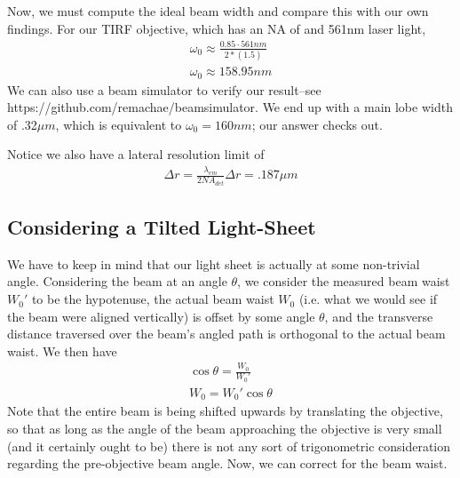     Now, we must compute the ideal beam width and compare this with our own findings. For our TIRF objective, which has an NA of and 561nm laser light,
    \begin{gather}
        \omega_0 \approx \frac{0.85\cdot561nm}{2*(1.5)}\\
        \omega_0 \approx 158.95nm
    \end{gather}
We can also use a beam simulator to verify our result--see https://github.com/remachae/beamsimulator. We end up with a main lobe width of .32$\mu m$, which is equivalent to $\omega_0=160nm$; our answer checks out.\par
Notice we also have a lateral \cite{Ernst} resolution limit of 
\begin{gather}
    \Delta r = \frac{\lambda_{em}}{2 NA_{det}}
    \Delta r = .187 \mu m
\end{gather}
\subsection{Considering a Tilted Light-Sheet}
We have to keep in mind that our light sheet is actually at some non-trivial angle. Considering the beam at an angle $\theta$, we consider the measured beam waist $W_0'$ to be the hypotenuse, the actual beam waist $W_0$ (i.e. what we would see if the beam were aligned vertically) is offset by some angle $\theta$, and the transverse distance traversed over the beam's angled path is orthogonal to the actual beam waist. We then have 
\begin{align}
    \cos \theta = \frac{W_{0}}{W_0'}\\
    W_0 = W_0' \cos \theta 
\end{align}
Note that the entire beam is being shifted upwards by translating the objective, so that as long as the angle of the beam approaching the objective is very small (and it certainly ought to be) there is not any sort of trigonometric consideration regarding the pre-objective beam angle. Now, we can correct for the beam waist.
